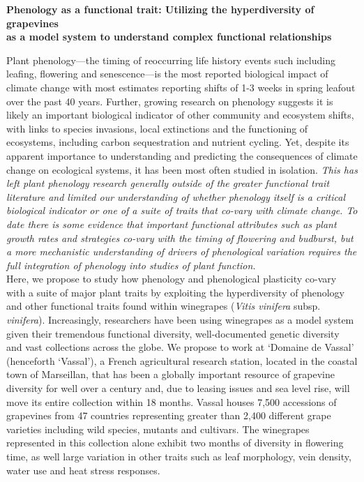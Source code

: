 \documentclass[10pt,letter,oneside]{article}
\begin{document}
\begin{center}
{\bf Phenology as a functional trait: Utilizing the hyperdiversity of grapevines \\ as a model system to understand complex functional relationships}
\end{center}
Plant phenology---the timing of reoccurring life history events such including leafing, flowering and senescence---is the most reported biological impact of climate change with most estimates reporting shifts of 1-3 weeks in spring leafout over the past 40 years. Further, growing research on phenology suggests it is likely an important biological indicator of other community and ecosystem shifts, with links to species invasions, local extinctions and the functioning of ecosystems, including carbon sequestration and nutrient cycling. Yet, despite its apparent importance to understanding and predicting the consequences of climate change on ecological systems, it has been most often studied in isolation. \emph{This has left plant phenology research generally outside of the greater functional trait literature and limited our understanding of whether phenology itself is a critical biological indicator or one of a suite of traits that co-vary with climate change. To date there is some evidence that important functional attributes such as plant growth rates and strategies co-vary with the timing of flowering and budburst, but a more mechanistic understanding of drivers of phenological variation requires the full integration of phenology into studies of plant function.} \\

Here, we propose to study how phenology and phenological plasticity co-vary with a suite of major plant traits by exploiting the hyperdiversity of phenology and other functional traits found within winegrapes (\emph{Vitis vinifera} subsp. \emph{vinifera}). Increasingly, researchers have been using winegrapes as a model system given their tremendous functional diversity, well-documented genetic diversity and vast collections across the globe. We propose to work at `Domaine de Vassal' (henceforth `Vassal'), a French agricultural research station, located in the coastal town of Marseillan, that has been a globally important resource of grapevine diversity for well over a century and, due to leasing issues and sea level rise, will move its entire collection within 18 months. Vassal houses 7,500 accessions of grapevines from 47 countries representing greater than 2,400 different grape varieties including wild species, mutants and cultivars. The winegrapes represented in this collection alone exhibit two months of diversity in flowering time, as well large variation in other traits such as leaf morphology, vein density, water use and heat stress responses. \\
\end{document}
